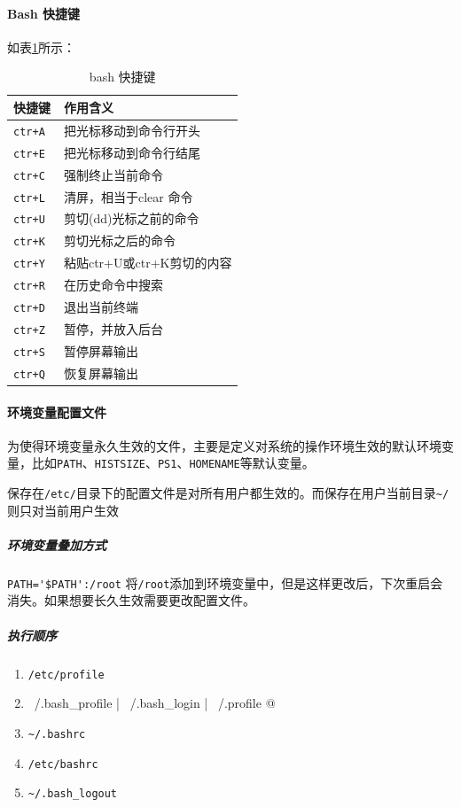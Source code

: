 \documentclass[UTF8,a4paper,12pt]{ctexbook}
\begin{document}
		\paragraph{Bash 快捷键}如表\ref{bash_k}所示：
			\begin{table}[H]
				\centering
				\caption{bash 快捷键}
				\label{bash_k}
				\begin{tabular}{p{2cm}<{\centering}|p{12cm}<{\centering}}
					\toprule[1.5pt]
					快捷键  &  作用含义\\
					\hline
					\verb|ctr+A | &  把光标移动到命令行开头   \\
					\verb|ctr+E | &  把光标移动到命令行结尾   \\
					\verb|ctr+C | &  强制终止当前命令   \\
					\verb|ctr+L | &  清屏，相当于clear 命令   \\
					\verb|ctr+U | &  剪切(dd)光标之前的命令   \\
					\verb|ctr+K | &  剪切光标之后的命令   \\
					\verb|ctr+Y | &  粘贴ctr+U或ctr+K剪切的内容   \\
					\verb|ctr+R | &  在历史命令中搜索   \\
					\verb|ctr+D | &  退出当前终端   \\
					\verb|ctr+Z | &  暂停，并放入后台   \\
					\verb|ctr+S | &  暂停屏幕输出   \\
					\verb|ctr+Q | &  恢复屏幕输出   \\
					\bottomrule[1.5pt]
				\end{tabular}
			\end{table}

		\paragraph{环境变量配置文件}为使得环境变量永久生效的文件，主要是定义对系统的操作环境生效的默认环境变量，比如\verb|PATH|、\verb|HISTSIZE|、\verb|PS1|、\verb|HOMENAME|等默认变量。
		
			保存在\verb|/etc/|目录下的配置文件是对所有用户都生效的。而保存在用户当前目录\verb|~/|则只对当前用户生效
		
			\subparagraph{环境变量叠加方式}\verb|PATH='$PATH':/root| 
				将\verb|/root|添加到环境变量中，但是这样更改后，下次重启会消失。如果想要长久生效需要更改配置文件。
			
			\subparagraph{执行顺序}
				\begin{enumerate}[itemindent = 2em]
					\item \verb|/etc/profile|  
					\item \verb@~/.bash_profile | ~/.bash_login | ~/.profile @
					\item \verb|~/.bashrc|
					\item \verb|/etc/bashrc|
					\item \verb|~/.bash_logout|
				\end{enumerate}
				
\end{document}

